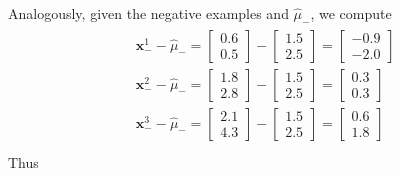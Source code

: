 \documentclass[leqno]{article}
\begin{document}
\noindent Analogously, given the negative examples and $\hat{\mu}_-$, we compute
\begin{gather*}
\begin{split}
&\textbf{x}_-^1 - \hat{\mu}_- = 
\begin{bmatrix}
   0.6\\
   0.5 
\end{bmatrix} - 
\begin{bmatrix}
   1.5\\
   2.5 
\end{bmatrix} = 
\begin{bmatrix}
   -0.9\\
   -2.0 
\end{bmatrix}\\
&\textbf{x}_-^2 - \hat{\mu}_- = 
\begin{bmatrix}
   1.8\\
   2.8 
\end{bmatrix} - 
\begin{bmatrix}
   1.5\\
   2.5 
\end{bmatrix} = 
\begin{bmatrix}
   0.3\\
   0.3 
\end{bmatrix}\\
&\textbf{x}_-^3 - \hat{\mu}_- = 
\begin{bmatrix}
   2.1\\
   4.3 
\end{bmatrix} - 
\begin{bmatrix}
   1.5\\
   2.5 
\end{bmatrix} = 
\begin{bmatrix}
   0.6\\
   1.8 
\end{bmatrix}\\
\end{split}
\end{gather*}
Thus
\end{document}
